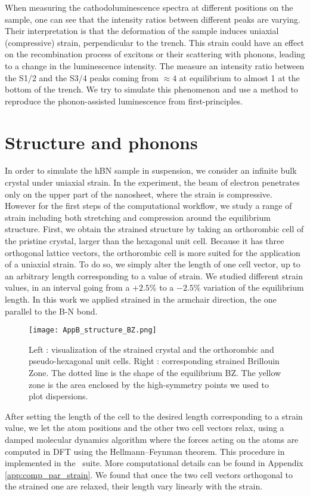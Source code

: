 When measuring the cathodoluminescence spectra at different positions on the sample, one can see that the intensity ratios between different peaks are varying. Their interpretation is that the deformation of the sample induces uniaxial (compressive) strain, perpendicular to the trench. This strain could have an effect on the recombination process of excitons or their scattering with phonons, leading to a change in the luminescence intensity. The measure an intensity ratio between the S1/2 and the S3/4 peaks coming from $\approx 4$ at equilibrium to almost 1 at the bottom of the trench. We try to simulate this phenomenon and use a method to reproduce the phonon-assisted luminescence from first-principles.


%
\section{Structure and phonons}
In order to simulate the hBN sample in suspension, we consider an infinite bulk crystal under uniaxial strain. In the experiment, the beam of electron penetrates only on the upper part of the nanosheet, where the strain is compressive. However for the first steps of the computational workflow, we study a range of strain including both stretching and compression around the equilibrium structure.
First, we obtain the strained structure by taking an orthorombic cell of the pristine crystal, larger than the hexagonal unit cell. Because it has three orthogonal lattice vectors, the orthorombic cell is more suited for the application of a uniaxial strain. To do so, we simply alter the length of one cell vector, up to an arbitrary length corresponding to a value of strain. We studied different strain values, in an interval going from a $+2.5\%$ to a $-2.5\%$ variation of the equilibrium length. In this work we applied strained in the armchair direction, the one parallel to the B-N bond. 
\begin{figure}[tbp]
	\vspace{0.5cm}
	\setcapindent{2em}
	\centering
	\texttt{[image: AppB\_structure\_BZ.png]}
	\caption{Left : visualization of the strained crystal and the orthorombic and pseudo-hexagonal unit cells. Right : corresponding strained Brillouin Zone. The dotted line is the shape of the equilibrium BZ. The yellow zone is the area enclosed by the high-symmetry points we used to plot dispersions.}
	\label{fig:strain_BZ}
\end{figure}
After setting the length of the cell to the desired length corresponding to a strain value, we let the atom positions and the other two cell vectors relax, using a damped molecular dynamics algorithm where the forces acting on the atoms are computed in \acrshort{DFT} using the Hellmann--Feynman theorem. This procedure in implemented in the \qe ~suite.\cite{giannozzi2009quantum,giannozzi2017advanced} More computational details can be found in Appendix \ref{app:comp_par_strain}. We found that once the two cell vectors orthogonal to the strained one are relaxed, their length vary linearly with the strain.\\
